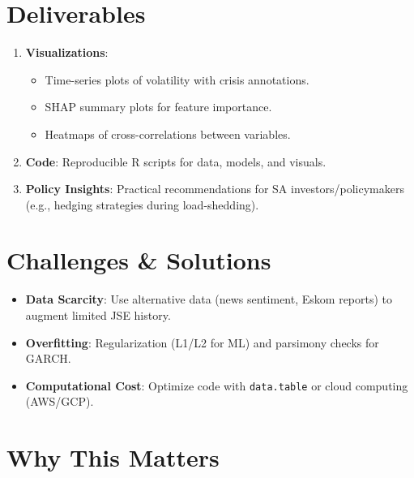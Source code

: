 \documentclass[11pt,preprint]{elsarticle}
\numberwithin{equation}{section}
\numberwithin{figure}{section}
\numberwithin{table}{section}
\def\tightlist{} %
\begin{document}
\section{Deliverables}\label{deliverables}

\begin{enumerate}
\def\labelenumi{\arabic{enumi}.}
\tightlist
\item
  \textbf{Visualizations}:

  \begin{itemize}
  \tightlist
  \item
    Time-series plots of volatility with crisis annotations.\\
  \item
    SHAP summary plots for feature importance.\\
  \item
    Heatmaps of cross-correlations between variables.\\
  \end{itemize}
\item
  \textbf{Code}: Reproducible R scripts for data, models, and visuals.\\
\item
  \textbf{Policy Insights}: Practical recommendations for SA
  investors/policymakers (e.g., hedging strategies during
  load-shedding).
\end{enumerate}

\section{Challenges \& Solutions}\label{challenges-solutions}

\begin{itemize}
\tightlist
\item
  \textbf{Data Scarcity}: Use alternative data (news sentiment, Eskom
  reports) to augment limited JSE history.\\
\item
  \textbf{Overfitting}: Regularization (L1/L2 for ML) and parsimony
  checks for GARCH.\\
\item
  \textbf{Computational Cost}: Optimize code with \texttt{data.table} or
  cloud computing (AWS/GCP).
\end{itemize}

\section{Why This Matters}\label{why-this-matters}
\end{document}
